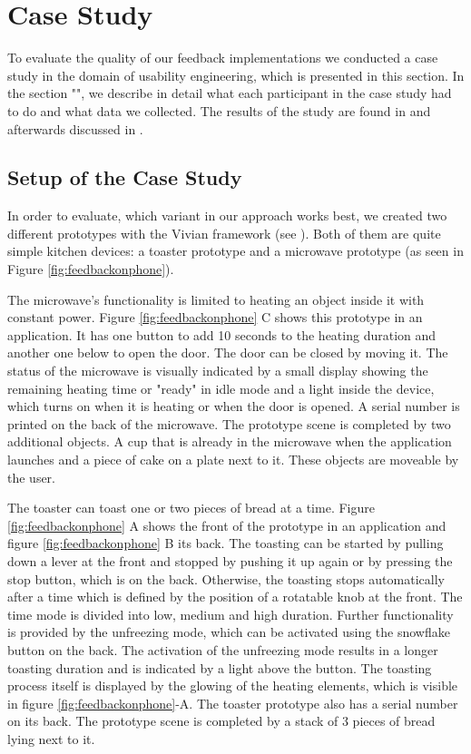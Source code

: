 \documentclass[11pt, a4paper]{article}
\begin{document}
	\section*{Case Study}\label{sec:casestudy}
		
		To evaluate the quality of our feedback implementations we conducted a case study in the domain of usability engineering, which is presented in this section. In the section "", we describe in detail what each participant in the case study had to do and what data we collected. The results of the study are found in  and afterwards discussed in .
		
		\subsection*{Setup of the Case Study}\label{ssec:setup}
			In order to evaluate, which variant in our approach works best, we created two different prototypes with the Vivian framework (see ). Both of them are quite simple kitchen devices: a toaster prototype and a microwave prototype (as seen in Figure \ref{fig:feedbackonphone}).

			The microwave's functionality is limited to heating an object inside it with constant power. Figure \ref{fig:feedbackonphone} C shows this prototype in an application. It has one button to add 10 seconds to the heating duration and another one below to open the door. The door can be closed by moving it. The status of the microwave is visually indicated by a small display showing the remaining heating time or "ready" in idle mode and a light inside the device, which turns on when it is heating or when the door is opened. A serial number is printed on the back of the microwave. The prototype scene is completed by two additional objects. A cup that is already in the microwave when the application launches and a piece of cake on a plate next to it. These objects are moveable by the user.

			The toaster can toast one or two pieces of bread at a time. Figure \ref{fig:feedbackonphone} A shows the front of the prototype in an application and figure \ref{fig:feedbackonphone} B its back. The toasting can be started by pulling down a lever at the front and stopped by pushing it up again or by pressing the stop button, which is on the back. Otherwise, the toasting stops automatically after a time which is defined by the position of a rotatable knob at the front. The time mode is divided into low, medium and high duration. Further functionality is provided by the unfreezing mode, which can be activated using the snowflake button on the back. The activation of the unfreezing mode results in a longer toasting duration and is indicated by a light above the button. The toasting process itself is displayed by the glowing of the heating elements, which is visible in figure \ref{fig:feedbackonphone}-A. The toaster prototype also has a serial number on its back. The prototype scene is completed by a stack of 3 pieces of bread lying next to it. 
			
\end{document}
